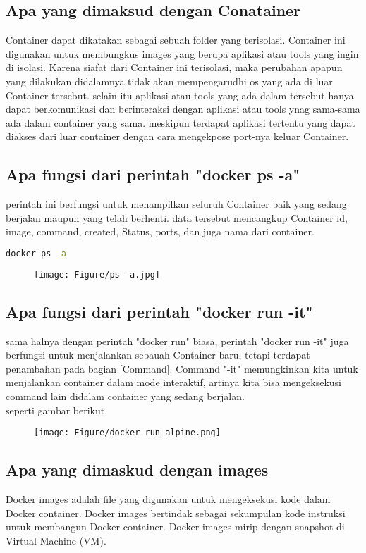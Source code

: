 \documentclass[11pt,a4paper]{article}
\begin{document}
\subsection{Apa yang dimaksud dengan Conatainer}
Container dapat dikatakan sebagai sebuah folder yang terisolasi. Container ini digunakan untuk 
membungkus images yang berupa aplikasi atau tools yang ingin di isolasi. Karena siafat 
dari Container ini terisolasi, maka perubahan apapun yang dilakukan didalamnya tidak akan
mempengarudhi os yang ada di luar Container tersebut. selain itu aplikasi atau tools yang 
ada dalam tersebut hanya dapat berkomunikasi dan berinteraksi dengan aplikasi atau tools ynag
sama-sama ada dalam container yang sama. meskipun terdapat aplikasi tertentu yang dapat 
diakses dari luar container dengan cara  mengekpose port-nya keluar Container.

\subsection{Apa fungsi dari perintah "docker ps -a"}
perintah ini berfungsi untuk menampilkan seluruh Container baik yang sedang berjalan maupun yang telah berhenti. 
data tersebut mencangkup Container id, image, command, created, Status, ports, dan juga nama dari container.
\begin{lstlisting}[language = bash]
	docker ps -a
\end{lstlisting}
\begin{figure}[h]
	\centering
	\texttt{[image: Figure/ps -a.jpg]}
\end{figure}

\newpage
\subsection{Apa fungsi dari perintah "docker run -it"}
sama halnya dengan perintah "docker run" biasa, perintah "docker run -it" juga berfungsi untuk menjalankan
sebauah Container baru, tetapi terdapat penambahan pada bagian [Command]. Command "-it" memungkinkan kita untuk menjalankan container dalam mode interaktif, artinya kita bisa mengeksekusi command lain didalam container yang sedang berjalan.\\
seperti gambar berikut.
\begin{figure}[h]
	\centering
	\texttt{[image: Figure/docker run alpine.png]}
\end{figure}


\subsection{Apa yang dimaskud dengan images}
Docker images adalah file yang digunakan untuk mengeksekusi kode dalam Docker container. Docker images bertindak sebagai sekumpulan kode instruksi untuk membangun Docker container. Docker images mirip dengan snapshot di Virtual Machine (VM). \cite{images_2021}
\end{document}
